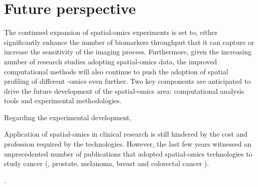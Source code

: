 \section{Future perspective}
The continued expansion of spatial-omics experiments is set to, either significantly enhance the number of biomarkers throughput that it can capture or increase the sensitivity of the imaging process. Furthermore, given the increasing number of research studies adopting spatial-omics data, the improved computational methods will also continue to push the adoption of spatial profiling of different -omics even further. Two key components are anticipated to drive the future development of the spatial-omics area: computational analysis tools and experimental methodologies. 

Regarding the experimental development, 

Application of spatial-omics in clinical research is still hindered by the cost and profession required by the technologies. However, the last few years witnessed an unprecedented number of publications that adopted spatial-omics technologies to study cancer (\ie, prostate, melanoma, breast and colorectal cancer \cite{berglund2018spatial, ji2020multimodal, thrane2018spatially, schurch2020coordinated, ji2012single}).  


 \cite{bankhead2017qupath,schneider2012nih}.  



% 

% 